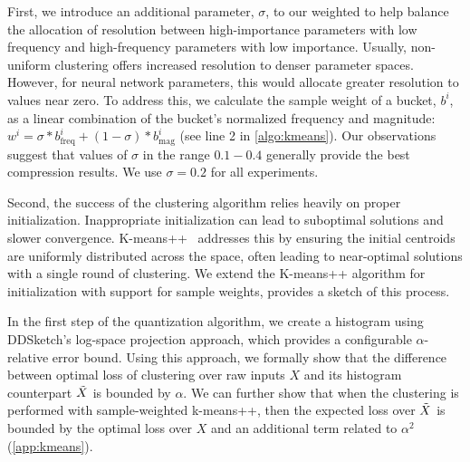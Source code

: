 First, we introduce an additional parameter, $\sigma$, to our weighted \kmeans to help balance the allocation of resolution between high-importance parameters with low frequency and high-frequency parameters with low importance. Usually, non-uniform clustering offers increased resolution to denser parameter spaces. However, for neural network parameters, this would allocate greater resolution to values near zero. To address this, we calculate the sample weight of a bucket, $b^{i}$, as a linear combination of the bucket's normalized frequency and magnitude: $w^{i} = \sigma * b^{i}_{\text{freq}} + (1 - \sigma) * b^{i}_{\text{mag}}$ (see line 2 in \cref{algo:kmeans}). Our observations suggest that values of $\sigma$ in the range $0.1-0.4$ generally provide the best compression results. We use $\sigma=0.2$ for all experiments.


Second, the success of the \kmeans clustering algorithm relies heavily on proper initialization. Inappropriate initialization can lead to suboptimal solutions and slower convergence. K-means++~\cite{kmeanspp} addresses this by ensuring the initial centroids are uniformly distributed across the space, often leading to near-optimal solutions with a single round of clustering. We extend the K-means++ \cite{kmeanspp} algorithm for initialization with support for sample weights,  provides a sketch of this process. 










 In the first step of the quantization algorithm, we create a histogram using DDSketch's log-space projection approach, which provides a configurable $\alpha$-relative error bound. Using this approach, we formally show that the difference between optimal loss of \kmeans clustering over raw inputs $X$ and its histogram counterpart $\tilde{X}$ is bounded by $\alpha$. We can further show that when the clustering is performed with sample-weighted k-means++, then the expected loss over $\tilde{X}$ is bounded by the optimal loss over $X$ and an additional term related to $\alpha^2$ (\cref{app:kmeans}).















